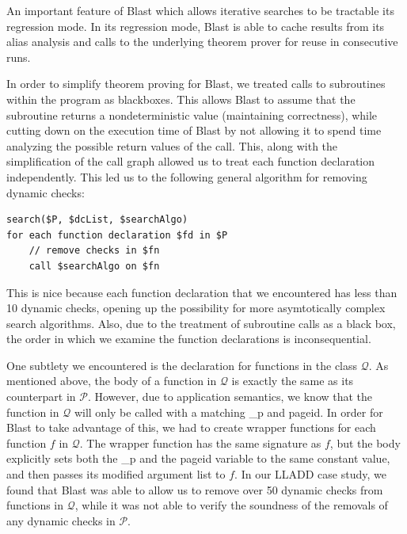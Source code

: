 \documentclass[10pt,letterpaper,twocolumn,english]{article}
\newcommand{\fP}{{$\mathcal P$}\xspace}
\newcommand{\fQ}{{$\mathcal Q$}\xspace}
\begin{document}
An important feature of Blast which allows iterative searches to
be tractable its regression mode.  In its regression mode, Blast is able
to cache results from its alias analysis and calls to the underlying
theorem prover for reuse in consecutive runs.

In order to simplify theorem proving for Blast, we treated calls to
subroutines within the program as blackboxes.  This allows Blast to
assume that the subroutine returns a nondeterministic value
(maintaining correctness), while cutting down on the execution time of
Blast by not allowing it to spend time analyzing the possible return
values of the call.  This, along with the simplification of the call
graph allowed us to treat each function declaration independently.  This
led us to the following general algorithm for removing dynamic checks:

\begin{verbatim}
search($P, $dcList, $searchAlgo)
for each function declaration $fd in $P
    // remove checks in $fn
    call $searchAlgo on $fn 
\end{verbatim}

This is nice because each function declaration that we encountered has
less than 10 dynamic checks, opening up the possibility for more
asymtotically complex search algorithms.  Also, due to the treatment of
subroutine calls as a black box, the order in which we examine the
function declarations is inconsequential.

One subtlety we encountered is the declaration for functions in the
class \fQ.  As mentioned above, the body of a function in \fQ is exactly
the same as its counterpart in \fP.  However, due to application
semantics, we know that the function in \fQ will only be called with a
matching \_p and pageid.  In order for Blast to take advantage of this,
we had to create wrapper functions for each function $f$ in \fQ.  The
wrapper function has the same signature as $f$, but the body explicitly
sets both the \_p and the pageid variable to the same constant value,
and then passes its modified argument list to $f$.  In our LLADD case
study, we found that Blast was able to allow us to remove over 50
dynamic checks from functions in \fQ, while it was not able to verify
the soundness of the removals of any dynamic checks in \fP.
\end{document}
